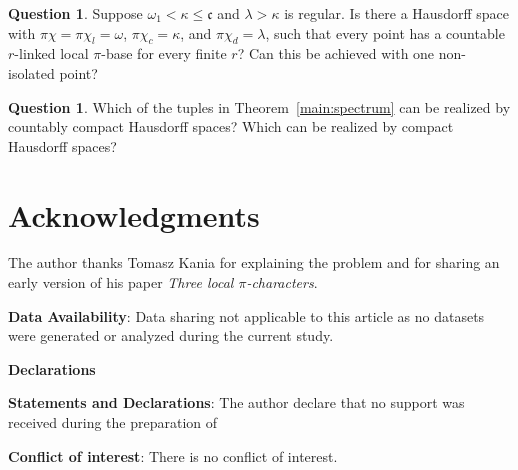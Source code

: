 \documentclass[10pt,a4paper]{amsart}
\theoremstyle{definition}
\newtheorem{question}[theorem]{Question}
\theoremstyle{remark}
\newcommand{\cont}{\mathfrak c}
\newcommand{\pc}{\pi\chi}
\newcommand{\pcl}{\pi\chi_l}
\newcommand{\pcc}{\pi\chi_c}
\newcommand{\pcd}{\pi\chi_d}
\begin{document}
\begin{question}
Suppose $\omega_1<\kappa\leqslant\cont$ and $\lambda>\kappa$ is regular. Is there a Hausdorff space with $\pc=\pcl=\omega$, $\pcc=\kappa$, and $\pcd=\lambda$, such that every point has a countable $r$-linked local $\pi$-base for every finite $r$? Can this be achieved with one non-isolated point?
\end{question}

\begin{question}
Which of the tuples in Theorem~\ref{main:spectrum} can be realized by countably compact Hausdorff spaces? Which can be realized by compact Hausdorff spaces?
\end{question}

\section*{Acknowledgments}
The author thanks Tomasz Kania for explaining the problem and for sharing an early version of his paper \emph{Three local $\pi$-characters}.

\bigskip\bigskip


\textbf{Data Availability}:  Data sharing not applicable to this article as no datasets were generated or analyzed during
the current study.



\textbf{Declarations}

\bigskip\bigskip


\textbf{Statements and Declarations}:  The author declare that no support was received during the preparation of

\textbf{Conflict of interest}: There is no conflict of interest.
\end{document}
